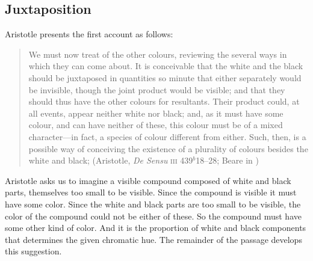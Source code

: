 \subsection{Juxtaposition} %
\label{sub:juxtaposition}

Aristotle presents the first account as follows:
\begin{quote}
	We must now treat of the other colours, reviewing the several ways in which they can come about. It is conceivable that the white and the black should be juxtaposed in quantities so minute that either separately would be invisible, though the joint product would be visible; and that they should thus have the other colours for resultants. Their product could, at all events, appear neither white nor black; and, as it must have some colour, and can have neither of these, this colour must be of a mixed character---in fact, a species of colour different from either. Such, then, is a possible way of conceiving the existence of a plurality of colours besides the white and black; (Aristotle, \emph{De Sensu} \textsc{iii} 439\( ^{b} \)18--28; Beare in \citealt[8]{Barnes:1984uq})
\end{quote}
Aristotle asks us to imagine a visible compound composed of white and black parts, themselves too small to be visible. Since the compound is visible it must have some color. Since the white and black parts are too small to be visible, the color of the compound could not be either of these. So the compound must have some other kind of color. And it is the proportion of white and black components that determines the given chromatic hue. The remainder of the passage develops this suggestion. 

